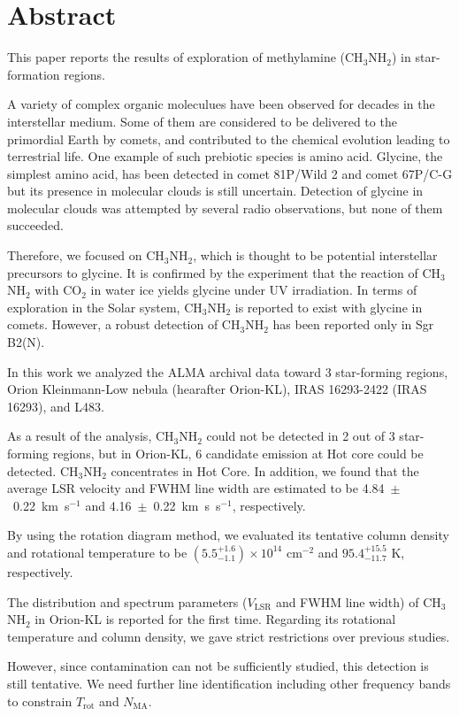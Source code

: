 \chapter*{Abstract}

\singlespacing


This paper reports the results of exploration of methylamine (CH$_3$NH$_2$) in star-formation regions.

A variety of complex organic moleculues have been observed for decades in the interstellar medium.
Some of them are considered to be delivered to the primordial Earth by comets, 
and contributed to the chemical evolution leading to terrestrial life.
One example of such prebiotic species is amino acid. Glycine, the simplest amino acid, 
has been detected in comet 81P/Wild 2 and comet 67P/C-G but its presence in molecular clouds 
is still uncertain. Detection of glycine in molecular clouds was attempted by several radio observations, 
but none of them succeeded.

Therefore, we focused on CH$_3$NH$_2$, which is thought to be potential interstellar precursors to glycine. 
It is confirmed by the experiment that the reaction of CH$_3$NH$_2$ with CO$_2$ in water ice 
yields glycine under UV irradiation. 
In terms of exploration in the Solar system, CH$_3$NH$_2$ is reported to exist with glycine in comets. 
However, a robust detection of CH$_3$NH$_2$ has been reported only in Sgr B2(N).

In this work we analyzed the ALMA archival data toward 3 star-forming regions, 
Orion Kleinmann-Low nebula (hearafter Orion-KL), IRAS 16293-2422 (IRAS 16293), and L483.

As a result of the analysis, CH$_3$NH$_2$ could not be detected in 2 out of 3 star-forming regions, 
but in Orion-KL, 6 candidate emission at Hot core could be detected.
CH$_3$NH$_2$ concentrates in Hot Core. In addition, we found that the average LSR velocity and FWHM line width are estimated to be 4.84~$\pm$~0.22~km~s$^{-1}$ 
and 4.16~$\pm$~0.22~km~s~s$^{-1}$, respectively. 

By using the rotation diagram method, we evaluated its tentative column density 
and rotational temperature to be $(5.5^{+1.6}_{-1.1} ) \times 10^{14}$ cm$^{-2}$ and $95.4^{+15.5}_{-11.7} \,\,\mathrm{K}$, respectively. 

The distribution and spectrum parameters ($V_{\mathrm{LSR}}$ and FWHM line width) of CH$_3$NH$_2$ in Orion-KL is reported for the first time.
Regarding its rotational temperature and column density, we gave strict restrictions over previous studies.

However, since contamination can not be sufficiently studied, this detection is still tentative.
We need further line identification including other frequency bands to constrain $T_{\mathrm{rot}}$ and $N_{\mathrm{MA}}$.

\doublespacing